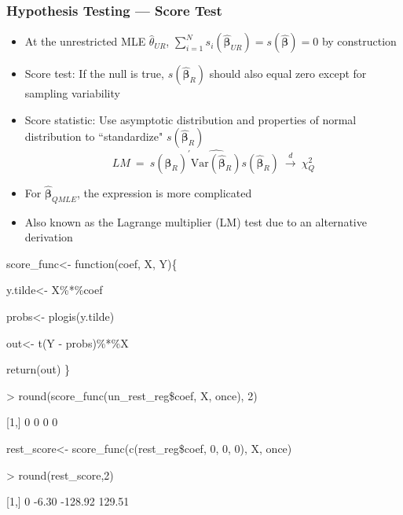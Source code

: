 \documentclass{beamer}
\begin{document}
\begin{frame}
\frametitle{Hypothesis Testing --- Score Test}
\begin{itemize}[<+->]
\item At the unrestricted MLE $\hat\theta_{UR}$, $\sum_{i=1}^{N} s_{i} (\widehat{\boldsymbol{\beta}}_{UR})=s(\widehat{\boldsymbol{\beta}}) = 0$ by construction
\item \alert{Score test}: If the null is true, $s(\widehat{\boldsymbol{\beta}}_{R})$
  should also equal zero except for sampling variability
\item Score statistic: Use asymptotic distribution and properties of normal distribution to  ``standardize" $s(\widehat{\boldsymbol{\beta}}_{R})$
$$ LM \ = \ s(\widehat{\boldsymbol{\beta}}_{R})^{'} \widehat{\text{Var}(\widehat{\boldsymbol{\beta}}_{R})} s(\widehat{\boldsymbol{\beta}}_{R})
\ \stackrel{d}{\longrightarrow} \ \chi_Q^2$$

\item For $\widehat{\boldsymbol{\beta}}_{QMLE}$, the expression is more complicated
\item Also known as the \alert{Lagrange multiplier} (LM) test due to an alternative derivation

\end{itemize}

\end{frame}



\begin{frame}

\small
\begin{semiverbatim}

 score\_func<- function(coef, X, Y)\{

  \hspace{0.15in} y.tilde<- X\%*\%coef

  \hspace{0.15in} probs<- plogis(y.tilde)

 \hspace{0.15in}  out<- t(Y - probs)\%*\%X

 \hspace{0.15in}  return(out)
   \}



> round(score\_func(un\_rest\_reg\$coef, X, once), 2)


[1,] 0      0   0 0


rest\_score<- score\_func(c(rest\_reg\$coef, 0, 0, 0), X, once)


> round(rest\_score,2)

[1,] 0 -6.30 -128.92 129.51

\end{semiverbatim}
\end{frame}
\end{document}
